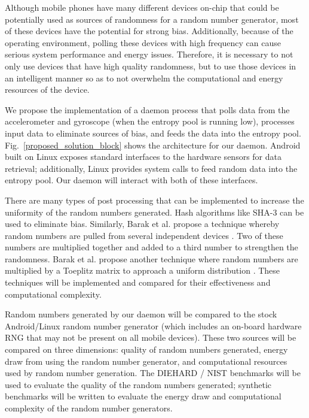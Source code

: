 \documentclass[conference]{IEEEtran}
\begin{document}
Although mobile phones have many different devices on-chip that could be potentially used as sources of randomness for a random number generator,
most of these devices have the potential for strong bias.  Additionally, because of the operating environment, polling these devices with high
frequency can cause serious system performance and energy issues.  Therefore, it is necessary to not only use devices that have high quality randomness,
but to use those devices in an intelligent manner so as to not overwhelm the computational and energy resources of the device.

We propose the implementation of a daemon process that polls data from the accelerometer and gyroscope (when the entropy pool is running low), processes
input data to eliminate sources of bias, and feeds the data into the entropy pool.  Fig.~\ref{proposed_solution_block} shows the architecture for
our daemon.  Android built on Linux exposes standard interfaces to the hardware sensors for data retrieval; additionally, Linux provides system calls
to feed random data into the entropy pool.  Our daemon will interact with both of these interfaces.

There are many types of post processing that can be implemented to increase the uniformity of the random numbers generated.  Hash algorithms like SHA-3
\cite{keccak} can be used to eliminate bias.  Similarly, Barak et al. propose a technique whereby random numbers are pulled from several independent
devices \cite{independent_devices}.  Two of these numbers are multiplied together and added to a third number to strengthen the randomness.  Barak et
al. propose another technique where random numbers are multiplied by a Toeplitz matrix to approach a uniform distribution \cite{true_rng}.  These
techniques will be implemented and compared for their effectiveness and computational complexity.

Random numbers generated by our daemon will be compared to the stock Android/Linux random number generator (which includes an on-board hardware
RNG that may not be present on all mobile devices).  These two sources will be compared on three dimensions: quality of random numbers generated,
energy draw from using the random number generator, and computational resources used by random number generation.  The DIEHARD \cite{diehard} / NIST 
\cite{nist} benchmarks will be used to evaluate the quality of the random numbers generated; synthetic benchmarks will be written to evaluate the energy
draw and computational complexity of the random number generators.
\end{document}
